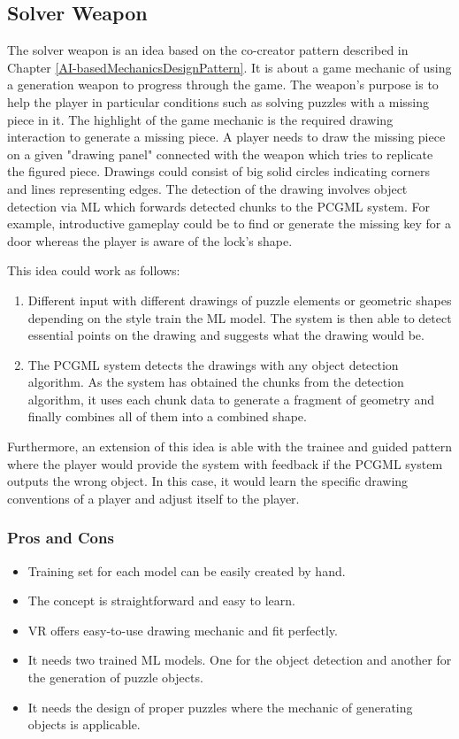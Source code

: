 \documentclass[MGS,Master,english]{twbook}%
\begin{document}
\subsection{Solver Weapon} \label{idea::solverWeapon}
The solver weapon is an idea based on the co-creator pattern described in Chapter \ref{AI-basedMechanicsDesignPattern}. It is about a game mechanic of using a generation weapon to progress through the game. The weapon's purpose is to help the player in particular conditions such as solving puzzles with a missing piece in it. The highlight of the game mechanic is the required drawing interaction to generate a missing piece. A player needs to draw the missing piece on a given "drawing panel" connected with the weapon which tries to replicate the figured piece. Drawings could consist of big solid circles indicating corners and lines representing edges. The detection of the drawing involves object detection via ML which forwards detected chunks to the PCGML system. For example, introductive gameplay could be to find or generate the missing key for a door whereas the player is aware of the lock's shape.

This idea could work as follows: 
\begin{enumerate}
	\item Different input with different drawings of puzzle elements or geometric shapes depending on the style train the ML model. The system is then able to detect essential points on the drawing and suggests what the drawing would be.
	\item The PCGML system detects the drawings with any object detection algorithm. As the system has obtained the chunks from the detection algorithm, it uses each chunk data to generate a fragment of geometry and finally combines all of them into a combined shape.
\end{enumerate}

Furthermore, an extension of this idea is able with the trainee and guided pattern where the player would provide the system with feedback if the PCGML system outputs the wrong object. In this case, it would learn the specific drawing conventions of a player and adjust itself to the player.

\subsubsection{Pros and Cons}
\begin{itemize}
	\item Training set for each model can be easily created by hand.
	\item The concept is straightforward and easy to learn.
	\item \ac{VR} offers easy-to-use drawing mechanic and fit perfectly.
	\item It needs two trained ML models. One for the object detection and another for the generation of puzzle objects. 
	\item It needs the design of proper puzzles where the mechanic of generating objects is applicable.
\end{itemize}
\end{document}
